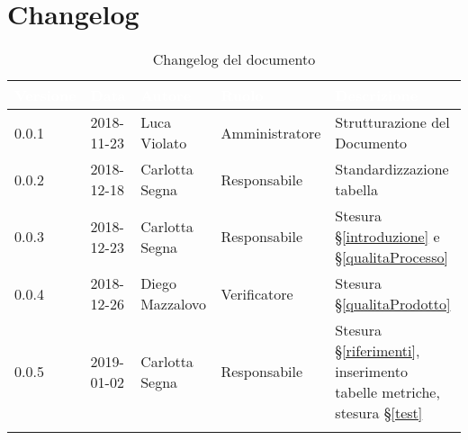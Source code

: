 \section{Changelog}

\begin{center}
\begin{longtable}[c]{|m{}|m{}|m{}|m{}|p{}|}
\hline
\rowcolor{bluelogo}\textbf{\textcolor{white}{Versione}} & \textbf{\textcolor{white}{Data}} & \textbf{\textcolor{white}{Autore}} & \textbf{\textcolor{white}{Ruolo}} & \textbf{\textcolor{white}{Descrizione}}\\
\hline \hline
\endfirsthead
0.0.1 & 2018-11-23 & Luca Violato & Amministratore & Strutturazione del Documento \\
\hline
\rowcolor{grigio} 0.0.2 & 2018-12-18 & Carlotta Segna & Responsabile & Standardizzazione tabella \\
\hline
0.0.3 & 2018-12-23 & Carlotta Segna & Responsabile & Stesura §\ref{introduzione} e §\ref{qualitaProcesso} \\
\hline
\rowcolor{grigio} 0.0.4 & 2018-12-26 & Diego Mazzalovo & Verificatore & Stesura §\ref{qualitaProdotto} \\
\hline
0.0.5 & 2019-01-02 & Carlotta Segna & Responsabile & Stesura §\ref{riferimenti}, inserimento tabelle metriche, stesura §\ref{test} \\
\hline
\caption{Changelog del documento}
\end{longtable}
\end{center}